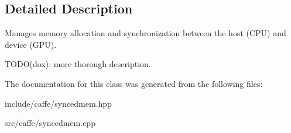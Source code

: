 \subsection{Detailed Description}
Manages memory allocation and synchronization between the host (C\+PU) and device (G\+PU). 

T\+O\+D\+O(dox)\+: more thorough description. 

The documentation for this class was generated from the following files\+:\begin{DoxyCompactItemize}
\item 
include/caffe/syncedmem.\+hpp\item 
src/caffe/syncedmem.\+cpp\end{DoxyCompactItemize}
